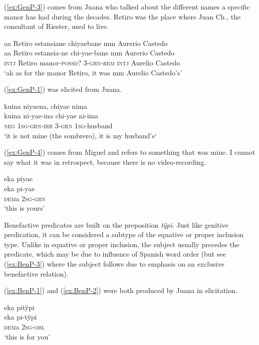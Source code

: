 (\ref{ex:GenP-3}) comes from Juana who talked about the different names a specific manor has had during the decades. Retiro was the place where Juan Ch., the consultant of Riester, used to live.

\ea\label{ex:GenP-3}
\begingl
\glpreamble aa Retiro estansiane chiyaebane mm Aurerio Castedo\\
\gla aa Retiro estansia-ne chi-yae-bane mm {Aurerio Castedo}\\
\glb \textsc{intj} Retiro manor-\textsc{possd}? 3-\textsc{grn}-\textsc{rem} \textsc{intj} {Aurelio Castedo}\\
\glft ‘ah as for the manor Retiro, it was mm Aurelio Castedo’s’
\endgl
\trailingcitation{[jxx-p120430l-2.019]}
\xe

(\ref{ex:GenP-1}) was elicited from Juana.

\ea\label{ex:GenP-1}
\begingl 
\glpreamble kuina niyaena, chiyae nima\\
\gla kuina ni-yae-ina chi-yae ni-ima\\ 
\glb \textsc{neg} 1\textsc{sg}-\textsc{grn}-\textsc{irr} 3-\textsc{grn} 1\textsc{sg}-husband\\ 
\glft ‘it is not mine (the sombrero), it is my husband's‘
\trailingcitation{[jxx-e081025s-1.123]}
\xe

(\ref{ex:GenP-4}) comes from Miguel and refers to something that was mine. I cannot say what it was in retrospect, because there is no video-recording.

\ea\label{ex:GenP-4}
\begingl
\glpreamble eka piyae\\
\gla eka pi-yae\\
\glb \textsc{dem}a 2\textsc{sg}-\textsc{grn}\\
\glft ‘this is yours’
\endgl
\trailingcitation{[mrx-c120509l.030]}
\xe


Benefactive predicates are built on the  preposition \textit{tÿpi}. Just like genitive predication, it can be considered a subtype of the equative or proper inclusion type. Unlike in equative or proper inclusion, the subject usually precedes the predicate, which may be due to influence of Spanish word order (but see (\ref{ex:BenP-3}) where the subject follows due to emphasis on an exclusive benefactive relation).

(\ref{ex:BenP-1}) and (\ref{ex:BenP-2}) were both produced by Juana in elicitation.

\ea\label{ex:BenP-1}
\begingl 
\glpreamble eka pitÿpi\\
\gla eka pi-tÿpi\\ 
\glb \textsc{dem}a 2\textsc{sg}-\textsc{obl}\\ 
\glft ‘this is for you’
\trailingcitation{[jmx-e090727s.067]}
\xe

